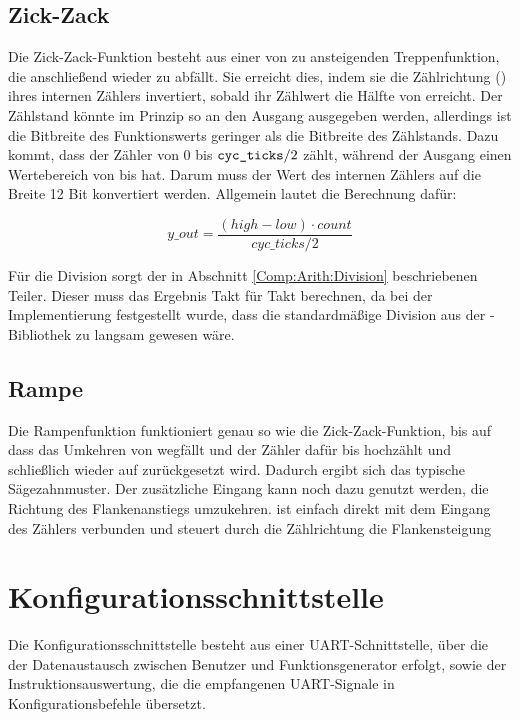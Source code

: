 \subsection{Zick-Zack}  \label{Comp:Func:ZigZag}
Die Zick-Zack-Funktion besteht aus einer von  zu  ansteigenden Treppenfunktion, die anschließend wieder zu  abfällt.
Sie erreicht dies, indem sie die Zählrichtung () ihres internen Zählers invertiert, sobald ihr Zählwert  die Hälfte von  erreicht.
Der Zählstand könnte im Prinzip so an den Ausgang ausgegeben werden, allerdings ist die Bitbreite des Funktionswerts geringer als die Bitbreite des Zählstands.
Dazu kommt, dass der Zähler von 0 bis $\texttt{cyc\_ticks} / 2$ zählt, während der Ausgang einen Wertebereich von  bis  hat.
Darum muss der Wert des internen Zählers auf die Breite 12 Bit konvertiert werden. Allgemein lautet die Berechnung dafür:

$$ y\_out = \frac{(high - low) \cdot count}{cyc\_ticks / 2} $$

Für die Division sorgt der in Abschnitt \cref{Comp:Arith:Division} beschriebenen Teiler.
Dieser  muss das Ergebnis Takt für Takt berechnen, da bei der Implementierung festgestellt wurde, dass die standardmäßige Division aus der -Bibliothek zu langsam gewesen wäre.


\subsection{Rampe} \label{Comp:Func:Ramp}
Die Rampenfunktion funktioniert genau so wie die Zick-Zack-Funktion, bis auf  dass das Umkehren von  wegfällt und der Zähler dafür bis  hochzählt und schließlich wieder auf  zurückgesetzt wird.
Dadurch ergibt sich das typische Sägezahnmuster.
Der zusätzliche Eingang  kann noch dazu genutzt werden, die Richtung des Flankenanstiegs umzukehren.
 ist einfach direkt mit dem Eingang  des Zählers verbunden und steuert durch die Zählrichtung die Flankensteigung

\section{Konfigurationsschnittstelle}
Die Konfigurationsschnittstelle  besteht aus einer
UART-Schnittstelle, über die der Datenaustausch zwischen Benutzer und
Funktionsgenerator erfolgt, sowie der Instruktionsauswertung, die die
empfangenen UART-Signale in Konfigurationsbefehle übersetzt.
